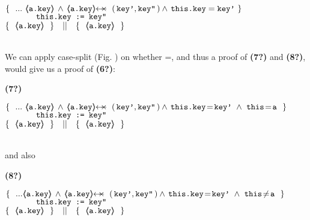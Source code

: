 \begin{example}
{{\begin{minipage}{.95\textwidth}
\begin{flushleft}
$\{ \  \   ... \   {\inside{\prg{a.key}}} \, \wedge \, \protectedFrom {\prg{a.key}} { (\, \prg{key'},\prg{key''}\, )}  \wedge  \,  \prg{this.key}=\prg{key'}\  \} \ $\\
$\ \ \ \ \ \ \ \ \ \ \  \mbox{\normalfont{\texttt{this.key := key''}}}\   $\\
$  \{\  \  {\inside{\prg{a.key}}}\   \   \} \ \ \  || \ \ \ \{  \ \  {\inside{\prg{a.key}}}\  \  \}  $ 
\end{flushleft}
\end{minipage}
}}
\\
 \vspace{.03cm}
\noindent
We can apply case-split  (\cf Fig. ) on whether =, and thus a proof of \textbf{(7?)} and \textbf{(8?)}, would give us a proof of \textbf{(6?)}:\\
 \vspace{.03cm}
{\small{  \begin{minipage}{.05\textwidth}
   \textbf{(7?)}\ \ 
\end{minipage}
\hfill
\begin{minipage}{.95\textwidth}
\begin{flushleft}
$\{ \  \   ... \   {\inside{\prg{a.key}}} \, \wedge \, \protectedFrom {\prg{a.key}} { (\, \prg{key'},\prg{key''}\, )} \wedge  \,  \prg{this.key}\!=\!\prg{key'}\ \wedge\ \prg{this}\!=\!\prg{a} \ \  \} \ $\\
$\ \ \ \ \ \ \ \ \ \ \   \mbox{\normalfont{\texttt{this.key := key''}}}\    $\\
$  \{\  \      {\inside{\prg{a.key}}} \   \   \} \ \ \  || \ \ \ \{  \ \  {\inside{\prg{a.key}}} \ \  \}  $ 
\end{flushleft}
\end{minipage}
}}
\\
and also
\\
 \vspace{.03cm}
{\small{  \begin{minipage}{.05\textwidth}
   \textbf{(8?)}\ \ 
\end{minipage}
\hfill
\begin{minipage}{.95\textwidth}
\begin{flushleft}
$\{ \  \   ...   {\inside{\prg{a.key}}} \, \wedge \, \protectedFrom {\prg{a.key}} { (\, \prg{key'},\prg{key''}\, )}  \wedge  \,  \prg{this.key}\!=\!\prg{key'}\ \wedge\ \prg{this}\!\neq\!\prg{a} \ \ \} \ $\\
$\ \ \ \ \ \ \ \ \ \ \  \mbox{\normalfont{\texttt{this.key := key''}}}\   $\\
$  \{\  \   {\inside{\prg{a.key}}}  \  \  \}\ \ \  || \ \ \ \{  \ \  {\inside{\prg{a.key}}} \ \  \}  $ 
\end{flushleft}
\end{minipage}
}}
 

\end{example}
